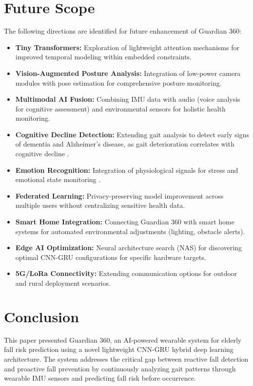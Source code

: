 \documentclass[conference]{IEEEtran}
\begin{document}
\section{Future Scope}

The following directions are identified for future enhancement of Guardian 360:

\begin{itemize}
    \item \textbf{Tiny Transformers:} Exploration of lightweight attention mechanisms for improved temporal modeling within embedded constraints.
    \item \textbf{Vision-Augmented Posture Analysis:} Integration of low-power camera modules with pose estimation for comprehensive posture monitoring.
    \item \textbf{Multimodal AI Fusion:} Combining IMU data with audio (voice analysis for cognitive assessment) and environmental sensors for holistic health monitoring.
    \item \textbf{Cognitive Decline Detection:} Extending gait analysis to detect early signs of dementia and Alzheimer's disease, as gait deterioration correlates with cognitive decline \cite{tsiakiri2025}.
    \item \textbf{Emotion Recognition:} Integration of physiological signals for stress and emotional state monitoring \cite{vogka2025, rahmani2024}.
    \item \textbf{Federated Learning:} Privacy-preserving model improvement across multiple users without centralizing sensitive health data.
    \item \textbf{Smart Home Integration:} Connecting Guardian 360 with smart home systems for automated environmental adjustments (lighting, obstacle alerts).
    \item \textbf{Edge AI Optimization:} Neural architecture search (NAS) for discovering optimal CNN-GRU configurations for specific hardware targets.
    \item \textbf{5G/LoRa Connectivity:} Extending communication options for outdoor and rural deployment scenarios.
\end{itemize}

\section{Conclusion}

This paper presented Guardian 360, an AI-powered wearable system for elderly fall risk prediction using a novel lightweight CNN-GRU hybrid deep learning architecture. The system addresses the critical gap between reactive fall detection and proactive fall prevention by continuously analyzing gait patterns through wearable IMU sensors and predicting fall risk before occurrence.
\end{document}
